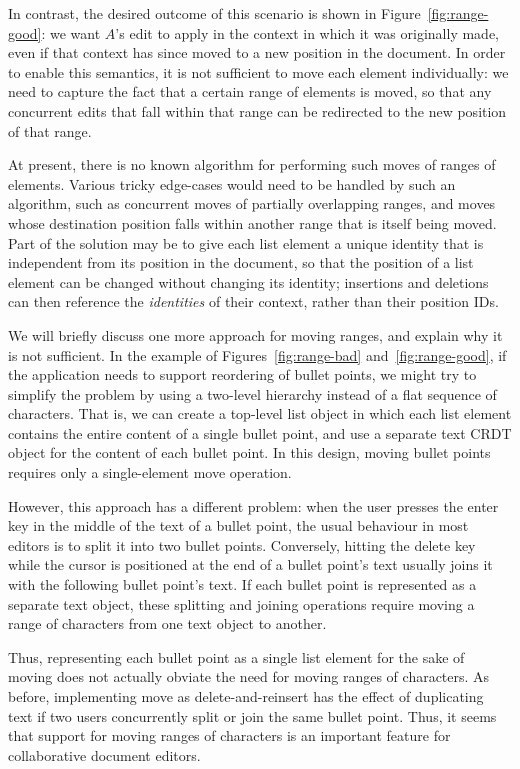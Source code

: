 \documentclass[sigplan,10pt]{acmart}
\begin{document}
In contrast, the desired outcome of this scenario is shown in Figure~\ref{fig:range-good}: we want $A$'s edit to apply in the context in which it was originally made, even if that context has since moved to a new position in the document.
In order to enable this semantics, it is not sufficient to move each element individually: we need to capture the fact that a certain range of elements is moved, so that any concurrent edits that fall within that range can be redirected to the new position of that range.

At present, there is no known algorithm for performing such moves of ranges of elements.
Various tricky edge-cases would need to be handled by such an algorithm, such as concurrent moves of partially overlapping ranges, and moves whose destination position falls within another range that is itself being moved.
Part of the solution may be to give each list element a unique identity that is independent from its position in the document, so that the position of a list element can be changed without changing its identity; insertions and deletions can then reference the \emph{identities} of their context, rather than their position IDs.

We will briefly discuss one more approach for moving ranges, and explain why it is not sufficient.
In the example of Figures~\ref{fig:range-bad} and~\ref{fig:range-good}, if the application needs to support reordering of bullet points, we might try to simplify the problem by using a two-level hierarchy instead of a flat sequence of characters.
That is, we can create a top-level list object in which each list element contains the entire content of a single bullet point, and use a separate text CRDT object for the content of each bullet point.
In this design, moving bullet points requires only a single-element move operation.

However, this approach has a different problem: when the user presses the enter key in the middle of the text of a bullet point, the usual behaviour in most editors is to split it into two bullet points.
Conversely, hitting the delete key while the cursor is positioned at the end of a bullet point's text usually joins it with the following bullet point's text.
If each bullet point is represented as a separate text object, these splitting and joining operations require moving a range of characters from one text object to another.

Thus, representing each bullet point as a single list element for the sake of moving does not actually obviate the need for moving ranges of characters.
As before, implementing move as delete-and-reinsert has the effect of duplicating text if two users concurrently split or join the same bullet point.
Thus, it seems that support for moving ranges of characters is an important feature for collaborative document editors.
\end{document}
